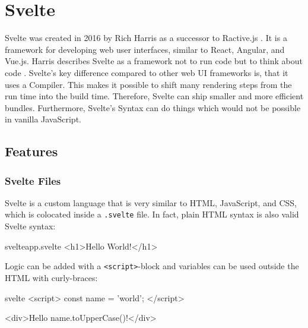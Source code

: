 \section{Svelte}
\label{sec:svelte}

Svelte was created in 2016 by Rich Harris as a successor to Ractive.js \cite{offerzen_origins_svelte_2022}. It is a framework for developing web user interfaces, similar to React, Angular, and Vue.js. Harris describes Svelte as a framework not to run code but to think about code \cite{offerzen_origins_svelte_2022}. Svelte's key difference compared to other web UI frameworks is, that it uses a Compiler. This makes it possible to shift many rendering steps from the run time into the build time. Therefore, Svelte can ship smaller and more efficient bundles. Furthermore, Svelte's Syntax can do things which would not be possible in vanilla JavaScript.

\subsection{Features}


\subsubsection{Svelte Files}

Svelte is a custom language that is very similar to HTML, JavaScript, and CSS, which is colocated inside a \texttt{.svelte} file. In fact, plain HTML syntax is also valid Svelte syntax:

\begin{myminted}{svelte}{app.svelte}
<h1>Hello World!</h1> 
\end{myminted}

Logic can be added with a \texttt{<script>}-block and variables can be used outside the HTML with curly-braces:

\begin{myminted}{svelte}{}
<script>
    const name = 'world';
</script>

<div>Hello {name.toUpperCase()}!</div>
\end{myminted}

